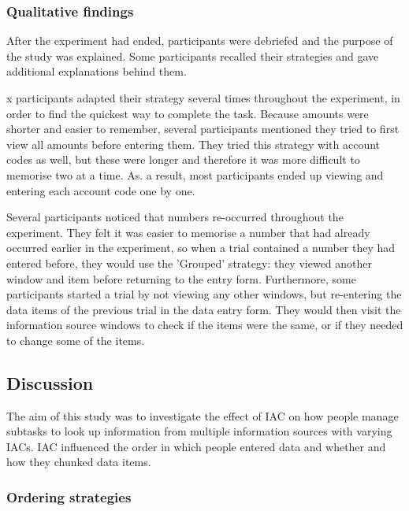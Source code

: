 \begin{table}
\begin{itemize}
\subsubsection{Qualitative findings}
After the experiment had ended, participants were debriefed and the purpose of the study was explained. Some participants recalled their strategies and gave additional explanations behind them.

x participants adapted their strategy several times throughout the experiment, in order to find the quickest way to complete the task. Because amounts were shorter and easier to remember, several participants mentioned they tried to first view all amounts before entering them. They tried this strategy with account codes as well, but these were longer and therefore it was more difficult to memorise two at a time. As. a result, most participants ended up viewing and entering each account code one by one.

Several participants noticed that numbers re-occurred throughout the experiment. They felt it was easier to memorise a number that had already occurred earlier in the experiment, so when a trial contained a number they had entered before, they would use the 'Grouped' strategy: they viewed another window and item before returning to the entry form. Furthermore, some participants started a trial by not viewing any other windows, but re-entering the data items of the previous trial in the data entry form. They would then visit the information source windows to check if the items were the same, or if they needed to change some of the items.

\subsection{Discussion}
The aim of this study was to investigate the effect of IAC on how people manage subtasks to look up information from multiple information sources with varying IACs. IAC influenced the order in which people entered data and whether and how they chunked data items. 

\subsubsection{Ordering strategies}


\end{itemize}
\end{table}
